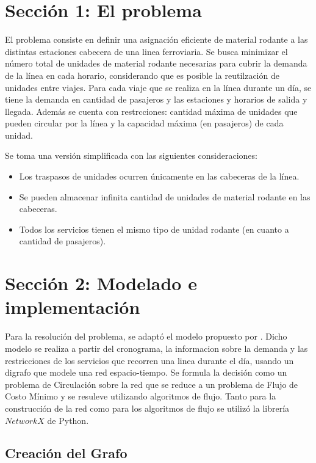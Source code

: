 \documentclass{article}
\begin{document}
\section*{Sección 1: El problema}
El problema consiste en definir una asignación eficiente de material rodante a las distintas estaciones cabecera de una linea ferroviaria. Se busca minimizar el número total de unidades de material rodante necesarias para cubrir la demanda de la línea en cada horario, considerando que es posible la reutilzación de unidades entre viajes. Para cada viaje que se realiza en la línea durante un día, se tiene la demanda en cantidad de pasajeros y las estaciones y horarios de salida y llegada. Además se cuenta con restrcciones: cantidad máxima de unidades que pueden circular por la línea y la capacidad máxima (en pasajeros) de cada unidad.

Se toma una versión simplificada con las siguientes consideraciones:
\begin{itemize}
    \item Los traspasos de unidades ocurren únicamente en las cabeceras de la línea.
    \item Se pueden almacenar infinita cantidad de unidades de material rodante en las cabeceras.
    \item Todos los servicios tienen el mismo tipo de unidad rodante (en cuanto a cantidad de pasajeros).

\end{itemize}

\section*{Sección 2: Modelado e implementación}
Para la resolución del problema, se adaptó  el modelo propuesto por \textcite{schrijver}. Dicho modelo se realiza a partir del cronograma, la informacion sobre la demanda y las restricciones de los servicios que recorren una linea durante el día, usando un digrafo que modele una red espacio-tiempo. Se formula la decisión como un problema de Circulación sobre la red que se reduce a un problema de Flujo de Costo Mínimo y se resuleve utilizando algoritmos de flujo. Tanto para la construcción de la red como para los algoritmos de flujo se utilizó la librería $NetworkX$ de Python.

\subsection*{Creación del Grafo}
\end{document}
